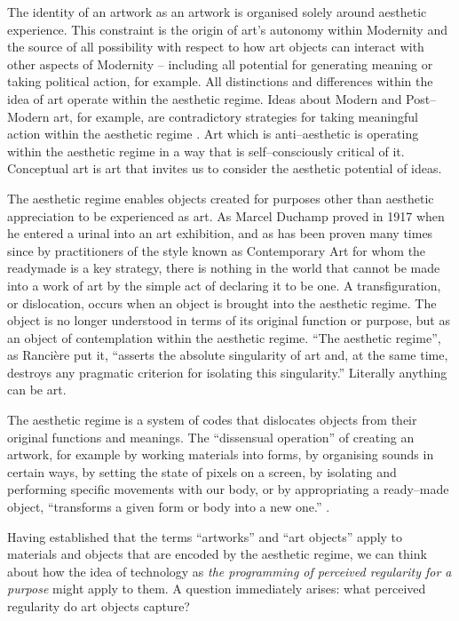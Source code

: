 \documentclass[letterpaper]{article}
\begin{document}
    The identity of an artwork as an artwork is organised solely around aesthetic experience. This constraint is the origin of art's autonomy within Modernity and the source of all possibility with respect to how art objects can interact with other aspects of Modernity – including all potential for generating meaning or taking political action, for example. All distinctions and differences within the idea of art operate within the aesthetic regime. Ideas about Modern and Post–Modern art, for example, are contradictory strategies for taking meaningful action within the aesthetic regime \citep[p213]{ZepkeSblmArt2017}. Art which is anti–aesthetic is operating within the aesthetic regime in a way that is self–consciously critical of it. Conceptual art is art that invites us to consider the aesthetic potential of ideas.

    The aesthetic regime enables objects created for purposes other than aesthetic appreciation to be experienced as art. As Marcel Duchamp proved in 1917 when he entered a urinal into an art exhibition, and as has been proven many times since by practitioners of the style known as Contemporary Art for whom the readymade is a key strategy, there is nothing in the world that cannot be made into a work of art by the simple act of declaring it to be one. A transfiguration, or dislocation, occurs when an object is brought into the aesthetic regime. The object is no longer understood in terms of its original function or purpose, but as an object of contemplation within the aesthetic regime. “The aesthetic regime”, as Rancière put it, “asserts the absolute singularity of art and, at the same time, destroys any pragmatic criterion for isolating this singularity.” Literally anything can be art.
    
    The aesthetic regime is a system of codes that dislocates objects from their original functions and meanings. The “dissensual operation” of creating an artwork, for example by working materials into forms, by organising sounds in certain ways, by setting the state of pixels on a screen, by isolating and performing specific movements with our body, or by appropriating a ready–made object, “transforms a given form or body into a new one.” \citep[p.54]{RancierThEmncptdSpcttr2009}.

    Having established that the terms “artworks” and “art objects” apply to materials and objects that are encoded by the aesthetic regime, we can think about how the idea of technology as {\emph{the programming of perceived regularity for a purpose}} might apply to them. A question immediately arises: what perceived regularity do art objects capture?
\end{document}
